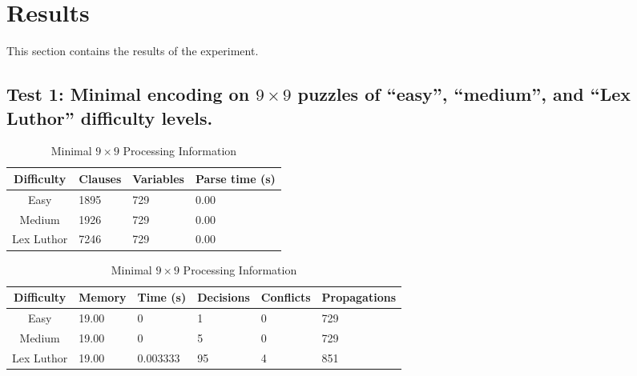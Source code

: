 \documentclass[conference,draftclsnofoot]{IEEEtran}
\begin{document}
\section{Results}
This section contains the results of the experiment.

\subsection{Test 1: Minimal encoding on $9 \times 9$ puzzles of ``easy'', ``medium'',
and ``Lex Luthor'' difficulty levels.}
\FloatBarrier
\begin{table}[htbp]
	\centering
	\begin{tabular}{c | l l l}
		Difficulty & Clauses & Variables & Parse time (s) \\\hline
		Easy 		& 1895 & 729 & 0.00 \\
		Medium 		& 1926 & 729 & 0.00 \\
		Lex Luthor 	& 7246 & 729 & 0.00
	\end{tabular}
	\caption{Minimal $9 \times 9$ Parse Information}
	\label{tab:summary}
	\begin{tabular}{c | l l p{20pt} p{20pt} l}
		Difficulty & Memory & Time (s) & Decisions &
		Conflicts & Propagations \\\hline
		Easy 		& 19.00 & 0 		& 1  & 0 & 729\\
		Medium 		& 19.00 & 0 		& 5  & 0 & 729\\
		Lex Luthor 	& 19.00 & 0.003333 	& 95 & 4 & 851
	\end{tabular}
	\caption{Minimal $9 \times 9$ Processing Information}
	\label{tab:summary}
\end{table}
\FloatBarrier
\newpage
\end{document}
